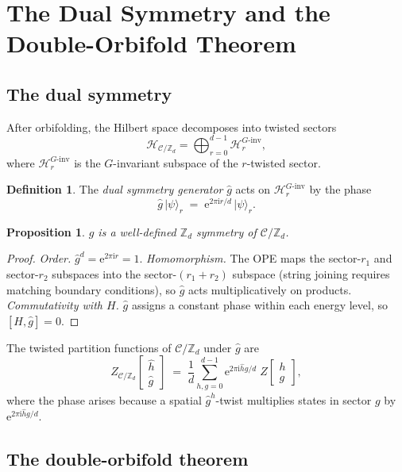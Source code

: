 \documentclass[11pt,a4paper]{article}
\theoremstyle{plain}
\newtheorem{proposition}[theorem]{Proposition}
\theoremstyle{definition}
\newtheorem{definition}[theorem]{Definition}
\theoremstyle{remark}
\newcommand{\Zd}{\mathbb{Z}_d}
\newcommand{\Hil}{\mathcal{H}}
\newcommand{\Cft}{\mathcal{C}}
\newcommand{\ii}{\mathrm{i}}
\newcommand{\ee}{\mathrm{e}}
\newcommand{\partfn}[2]{Z\!\begin{bmatrix}#1\\#2\end{bmatrix}}
\begin{document}
\section{The Dual Symmetry and the Double-Orbifold Theorem}

\subsection{The dual symmetry}

After orbifolding, the Hilbert space decomposes into twisted sectors
\[
  \Hil_{\Cft/\Zd} = \bigoplus_{r=0}^{d-1} \Hil_r^{G\text{-inv}},
\]
where $\Hil_r^{G\text{-inv}}$ is the $G$-invariant subspace of the
$r$-twisted sector.

\begin{definition}\label{def:dual}
  The \emph{dual symmetry generator} $\hat{g}$ acts on
  $\Hil_r^{G\text{-inv}}$ by the phase
  \[
    \hat{g}\,\lvert\psi\rangle_r \;=\; \ee^{2\pi\ii r/d}\,\lvert\psi\rangle_r.
  \]
\end{definition}

\begin{proposition}
  $\hat{g}$ is a well-defined $\Zd$ symmetry of $\Cft/\Zd$.
\end{proposition}
\begin{proof}
  \emph{Order.}  $\hat{g}^d = \ee^{2\pi\ii r} = 1$.
  \emph{Homomorphism.}  The OPE maps the sector-$r_1$ and sector-$r_2$
  subspaces into the sector-$(r_1{+}r_2)$ subspace (string joining
  requires matching boundary conditions), so $\hat{g}$ acts
  multiplicatively on products.
  \emph{Commutativity with $H$.}  $\hat{g}$ assigns a constant phase
  within each energy level, so $[H,\hat{g}]=0$.
\end{proof}

The twisted partition functions of $\Cft/\Zd$ under $\hat{g}$ are
\begin{equation}\label{eq:twisted-orb}
  Z_{\Cft/\Zd}\!\begin{bmatrix}\hat{h}\\\hat{g}\end{bmatrix}
  \;=\;
  \frac{1}{d}\sum_{h,g=0}^{d-1}
  \ee^{2\pi\ii\hat{h}g/d}\;\partfn{h}{g},
\end{equation}
where the phase arises because a spatial $\hat{g}^{\hat{h}}$-twist
multiplies states in sector $g$ by $\ee^{2\pi\ii\hat{h}g/d}$.

\subsection{The double-orbifold theorem}
\end{document}
